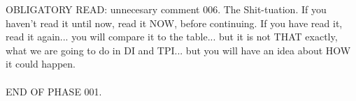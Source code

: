 	\noindent
	OBLIGATORY READ: unnecesary comment 006. The Shit-tuation. If you haven't read it until now, read it NOW, before continuing. If you have read it, read it again... you will compare it to the table... but it is not THAT exactly, what we are going to do in DI and TPI... but you will have an idea about HOW it could happen.
	\\\\
	
	\noindent
	END OF PHASE 001.
	